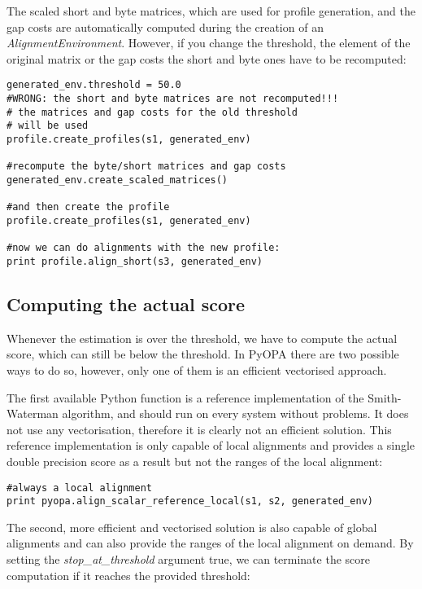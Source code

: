 \documentclass[12pt]{article}
\newcommand{\pp}{PyOPA}
\newcommand{\alenv}{\emph{AlignmentEnvironment}}
\begin{document}
The scaled short and byte matrices, which are used for profile generation, and the gap costs are automatically computed during the creation of an \alenv{}. However, if you change the threshold, the element of the original matrix or the gap costs the short and byte ones have to be recomputed:
\begin{lstlisting}
generated_env.threshold = 50.0
#WRONG: the short and byte matrices are not recomputed!!!
# the matrices and gap costs for the old threshold
# will be used
profile.create_profiles(s1, generated_env)

#recompute the byte/short matrices and gap costs
generated_env.create_scaled_matrices()

#and then create the profile
profile.create_profiles(s1, generated_env)

#now we can do alignments with the new profile:
print profile.align_short(s3, generated_env)
\end{lstlisting}

\subsection{Computing the actual score}
\label{subsec:compAct}

Whenever the estimation is over the threshold, we have to compute the actual score, which can still be below the threshold. In \pp{} there are two possible ways to do so, however, only one of them is an efficient vectorised approach.

The first available Python function is a reference implementation of the Smith-Waterman algorithm, and should run on every system without problems. It does not use any vectorisation, therefore it is clearly not an efficient solution. This reference implementation is only capable of local alignments and provides a single double precision score as a result but not the ranges of the local alignment:

\begin{lstlisting}
#always a local alignment
print pyopa.align_scalar_reference_local(s1, s2, generated_env)
\end{lstlisting}

The second, more efficient and vectorised solution is also capable of global alignments and can also provide the ranges of the local alignment on demand. By setting the \emph{stop\_at\_threshold} argument true, we can terminate the score computation if it reaches the provided threshold:
\end{document}
